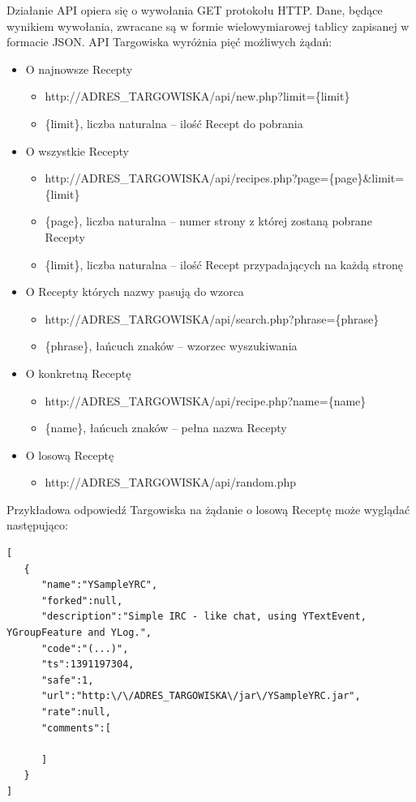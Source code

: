 \documentclass[11pt,a4paper,polish,thesis]{dcsbook}
\begin{document}
Działanie API opiera się o wywołania GET protokołu HTTP. Dane, będące wynikiem wywołania, zwracane są w formie wielowymiarowej tablicy zapisanej w formacie JSON. API
Targowiska wyróżnia pięć możliwych żądań:
\begin{itemize}
\item O najnowsze Recepty
\begin{itemize}
\item http://ADRES\_TARGOWISKA/api/new.php?limit=\{limit\}
\item \{limit\}, liczba naturalna -- ilość Recept do pobrania
\end{itemize}
\item O wszystkie Recepty
\begin{itemize}
\item http://ADRES\_TARGOWISKA/api/recipes.php?page=\{page\}\&limit=\{limit\}
\item \{page\}, liczba naturalna -- numer strony z której zostaną pobrane Recepty
\item \{limit\}, liczba naturalna -- ilość Recept przypadających na każdą stronę
\end{itemize}
\item O Recepty których nazwy pasują do wzorca
\begin{itemize}
\item http://ADRES\_TARGOWISKA/api/search.php?phrase=\{phrase\}
\item \{phrase\}, łańcuch znaków -- wzorzec wyszukiwania
\end{itemize}
\item O konkretną Receptę
\begin{itemize}
\item http://ADRES\_TARGOWISKA/api/recipe.php?name=\{name\}
\item \{name\}, łańcuch znaków -- pełna nazwa Recepty
\end{itemize}
\item O losową Receptę
\begin{itemize}
\item http://ADRES\_TARGOWISKA/api/random.php
\end{itemize}
\end{itemize}
Przykładowa odpowiedź Targowiska na żądanie o losową Receptę może wyglądać następująco:
\begin{verbatim}
[
   {
      "name":"YSampleYRC",
      "forked":null,
      "description":"Simple IRC - like chat, using YTextEvent, YGroupFeature and YLog.",
      "code":"(...)",
      "ts":1391197304,
      "safe":1,
      "url":"http:\/\/ADRES_TARGOWISKA\/jar\/YSampleYRC.jar",
      "rate":null,
      "comments":[

      ]
   }
]
\end{verbatim}
\end{document}
